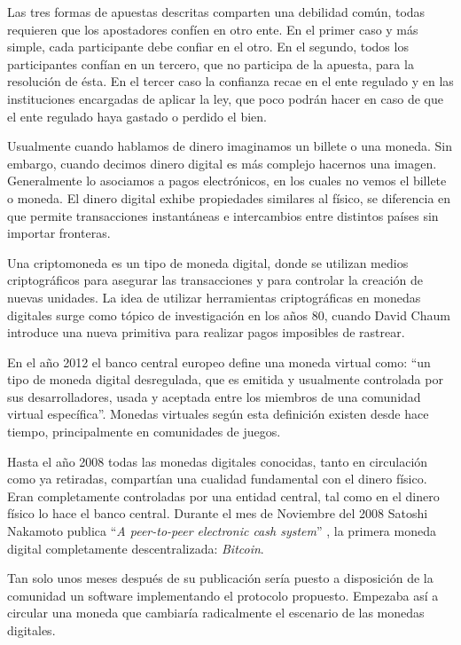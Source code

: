\begin{intro}
Las tres formas de apuestas descritas comparten una debilidad com\'un, todas
  requieren que los apostadores confíen en otro ente. En el primer caso y m\'as
  simple, cada participante debe confiar en el otro. En el segundo, todos los
  participantes confían en un tercero, que no participa de la apuesta, para la
  resoluci\'on de \'esta. En el tercer caso la confianza recae en el ente regulado
  y en las instituciones encargadas de aplicar la ley, que poco podr\'an hacer en
  caso de que el ente regulado haya gastado o perdido el bien.




Usualmente cuando hablamos de dinero imaginamos un billete o una moneda. Sin
  embargo, cuando decimos dinero digital es m\'as complejo hacernos una imagen.
  Generalmente lo asociamos a pagos electr\'onicos, en los cuales no vemos el
  billete o moneda. El dinero digital exhibe propiedades similares al f\'isico,
  se diferencia en que permite transacciones instant\'aneas e intercambios
  entre distintos pa\'ises sin importar fronteras.

Una criptomoneda es un tipo de moneda digital, donde se utilizan medios
  criptogr\'aficos para asegurar las transacciones y para controlar la
  creaci\'on de nuevas unidades. La idea de utilizar herramientas
  criptogr\'aficas en monedas digitales surge como t\'opico de
  investigaci\'on en los a\~nos 80, cuando David Chaum \cite{chaum1983blind}
  introduce una nueva primitiva para realizar pagos imposibles de rastrear.

En el a\~no 2012 el banco central europeo \cite{bcentraleuro} define una moneda
  virtual como: \enquote{un tipo de moneda digital desregulada, que es emitida y
  usualmente controlada por sus desarrolladores, usada y aceptada entre los
  miembros de una comunidad virtual espec\'ifica}. Monedas virtuales
  seg\'un esta definici\'on existen desde hace tiempo, principalmente en
  comunidades de juegos.

Hasta el a\~no 2008 todas las monedas digitales conocidas, tanto en
  circulaci\'on como ya retiradas, compart\'ian una cualidad fundamental con
  el dinero f\'isico. Eran completamente controladas por una entidad central,
  tal como en el dinero f\'isico lo hace el banco central. Durante el mes de
  Noviembre del 2008 Satoshi Nakamoto publica ``\textit{A peer-to-peer
  electronic cash system}'' \cite{nakamoto2008bitcoin}, la primera moneda
  digital completamente descentralizada\cite{brito2013bitcoin}:
  \textit{Bitcoin}.

Tan solo unos meses despu\'es de su publicaci\'on ser\'ia puesto a
  disposici\'on de la comunidad un software implementando el protocolo
  propuesto. Empezaba as\'i a circular una moneda que cambiar\'ia radicalmente
  el escenario de las monedas digitales.


\end{intro}
